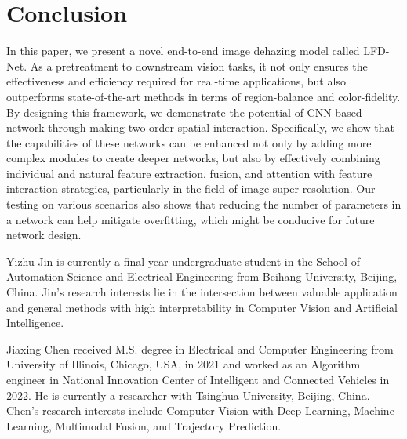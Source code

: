 \documentclass[lettersize,journal]{IEEEtran}
\begin{document}
\section{Conclusion}
In this paper, we present a novel end-to-end image dehazing model called LFD-Net. As a pretreatment to downstream vision tasks, it not only ensures the effectiveness and efficiency required for real-time applications, but also outperforms state-of-the-art methods in terms of region-balance and color-fidelity. By designing this framework, we demonstrate the potential of CNN-based network through making two-order spatial interaction. Specifically, we show that the capabilities of these networks can be enhanced not only by adding more complex modules to create deeper networks, but also by effectively combining individual and natural feature extraction, fusion, and attention with feature interaction strategies, particularly in the field of image super-resolution. Our testing on various scenarios also shows that reducing the number of parameters in a network can help mitigate overfitting, which might be conducive for future network design.




\begin{IEEEbiography}{Yizhu Jin} is currently a final year undergraduate student in the School of Automation Science and Electrical Engineering from Beihang University, Beijing, China. Jin's research interests lie in the intersection between valuable application and general methods with high interpretability in Computer Vision and Artificial Intelligence.  
\end{IEEEbiography}


\begin{IEEEbiography}{Jiaxing Chen} received M.S. degree in Electrical and Computer Engineering from University of Illinois, Chicago, USA, in 2021 and worked as an Algorithm engineer in National Innovation Center of Intelligent and Connected Vehicles in 2022. He is currently a researcher with Tsinghua University, Beijing, China. Chen's research interests include Computer Vision with Deep Learning, Machine Learning, Multimodal Fusion, and Trajectory Prediction.
\end{IEEEbiography}
\end{document}
